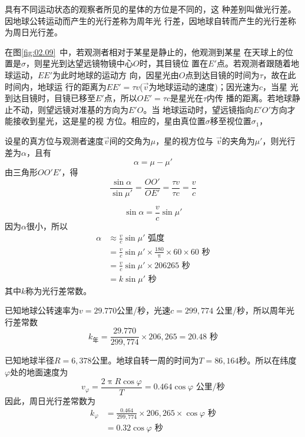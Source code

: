 具有不同运动状态的观察者所见的星体的方位是不同的，这
种差别叫做光行差。因地球公转运动而产生的光行差称为周年光
行差，因地球自转而产生的光行差称为周日光行差。

在图\ref{fig:02.09}~中，若观测者相对于某星是静止的，他观测到某星
在天球上的位置是$\sigma$，则星光到达望远镜物镜中心$O$时，其目镜位
置在$E'$点。若观测者跟随着地球运动，$EE'$为此时地球的运动方
向，因星光由$O$点到达目镜的时间为$\tau$，故在此时间内，地球运
行的距离为$EE'=\tau v$($\vec{v}$为地球运动的速度)；因光速为$c$，当星
光到达目镜时，目镜已移至$E'$点，所以$OE'=\tau c$是星光在$\tau$内传
播的距离。若地球静止不动，则望远镜对准基的方向为$E'O$。当
地球运动时，望远镜指向$E'O'$方向才能接收到星光，这是星的视
方位。相应的，星由真位置$\sigma$移至视位置$\sigma_1$，

设星的真方位与观测者速度$\vec{v}$间的交角为$\mu$，星的视方位与
$\vec{v}$的夹角为$\mu'$，则光行差为$\alpha$，且有
\begin{equation*}
  \alpha=\mu-\mu'
\end{equation*}
由三角形$OO'E'$，得
\begin{equation*}
  \frac{\sin\alpha}{\sin\mu'}=\frac{OO'}{OE'}=\frac{\tau v}{\tau c}=\frac{v}{c}
\end{equation*}

\clearpage
\begin{equation*}
  \sin\alpha=\frac{v}{c}\sin\mu'
\end{equation*}
因为$\alpha$很小，所以
\begin{align*}
  \alpha & \approx\frac{v}{c}\sin\mu'\text{ 弧度}                                     \\
         & =\frac{v}{c}\sin\mu'\times\frac{180}{\uppi}\times 60 \times 60 \text{ 秒} \\
         & =\frac{v}{c}\sin\mu'\times 206265\text{ 秒}                               \\
         & =k\sin\mu'\text{ 秒}
\end{align*}
其中$k$称为光行差常数。

已知地球公转速率为$v=29.770$公里/秒，光速$c=299,774$
公里/秒，所以周年光行差常数
\begin{equation*}
  k_\text{年}=\frac{29.770}{299,774}\times 206,265=20.48\text{ 秒}
\end{equation*}

已知地球半径$R=6,378$公里。地球自转一周的时间为$T=
  86,164$秒。所以在纬度$\varphi$处的地面速度为
\begin{equation*}
  v_\varphi=\frac{2\uppi R\cos\varphi}{T}=0.464\cos\varphi\text{ 公里/秒}
\end{equation*}
因此，周日光行差常数为
\begin{align*}
  k_\varphi & =\frac{0.464}{299,774}\times 206,265\times\cos\varphi\text{ 秒} \\
            & =0.32\cos\varphi\text{ 秒}
\end{align*}
